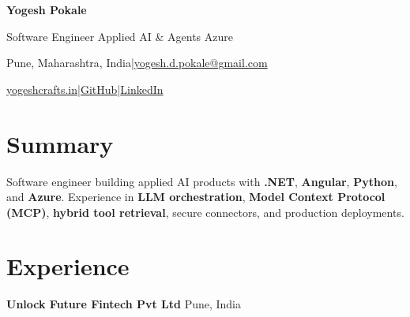 \documentclass[10pt,letterpaper]{article}
\begin{document}
\color{foreground}
{\centering
{\fontsize{23}{25}\selectfont\bfseries Yogesh Pokale}\par\vspace{4pt}
{\sffamily\small\color{primary}Software Engineer \textperiodcentered{} Applied AI \& Agents \textperiodcentered{} Azure}\par\vspace{4pt}
{\small\color{muted}Pune, Maharashtra, India\enspace|\enspace\href{mailto:yogesh.d.pokale@gmail.com}{\color{muted}yogesh.d.pokale@gmail.com}}\par\vspace{3pt}
{\small\href{https://yogeshcrafts.in}{\color{muted}yogeshcrafts.in}\enspace|\enspace\href{https://github.com/YogeshDPokale}{\color{muted}GitHub}\enspace|\enspace\href{https://www.linkedin.com/in/yogesh-pokale-7b887025b}{\color{muted}LinkedIn}}\par}
\vspace{3pt}
\section{Summary}
Software engineer building applied AI products with \textbf{.NET}, \textbf{Angular}, \textbf{Python}, and \textbf{Azure}. Experience in \textbf{LLM orchestration}, \textbf{Model Context Protocol (MCP)}, \textbf{hybrid tool retrieval}, secure connectors, and production deployments.
\section{Experience}
\textbf{Unlock Future Fintech Pvt Ltd} \hfill {\small\color{muted}Pune, India}\par
\end{document}
